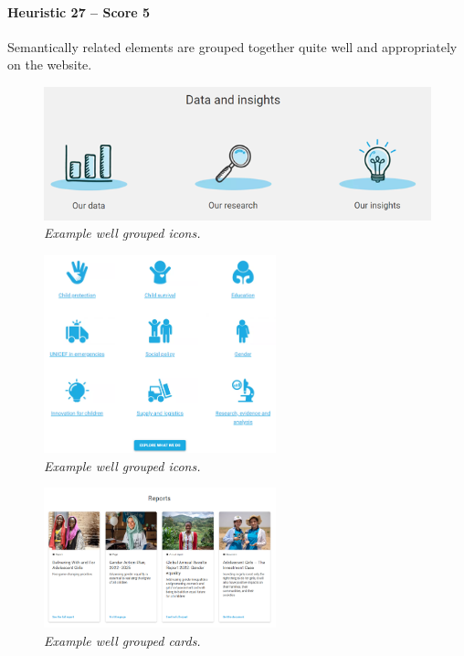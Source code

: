 \paragraph*{Heuristic 27 – Score 5}
Semantically related elements are grouped together quite well and appropriately on the website.
\begin{figure}[h]
	\includegraphics[width=\textwidth]{Picture24.png}
	\captionsetup{font=small}
	\caption{\textit{Example well grouped icons.}}
	\label{fig:label24}
\end{figure}
\begin{figure}[h]
	\centering
	\begin{center}
		\includegraphics[width=0.6\textwidth]{Picture26.png}
	\end{center}
	\captionsetup{font=small}
	\caption{\textit{Example well grouped icons.}}
	\label{fig:label25}
\end{figure}
\begin{figure}[h]
	\centering
	\begin{center}
		\includegraphics[width=0.6\textwidth]{Picture25.png}
	\end{center}
	\captionsetup{font=small}
	\caption{\textit{Example well grouped cards.}}
	\label{fig:label26}
\end{figure}

